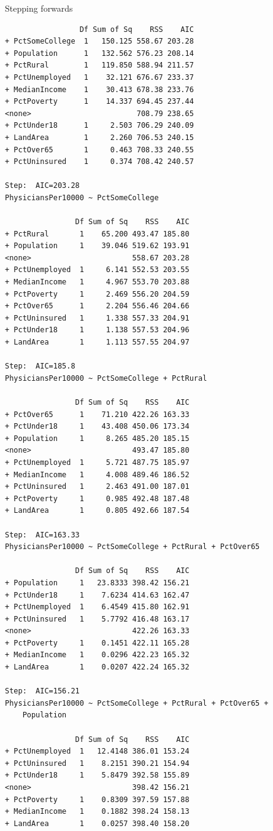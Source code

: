 \documentclass{beamer}\usepackage[]{graphicx}\usepackage[]{color}
\makeatletter
\newenvironment{kframe}{%
 \def\at@end@of@kframe{}%
 \ifinner\ifhmode%
  \def\at@end@of@kframe{\end{minipage}}%
  \begin{minipage}{\columnwidth}%
 \fi\fi%
 \def\FrameCommand##1{\hskip\@totalleftmargin \hskip-\fboxsep
 \colorbox{shadecolor}{##1}\hskip-\fboxsep
     \hskip-\linewidth \hskip-\@totalleftmargin \hskip\columnwidth}%
 \MakeFramed {\advance\hsize-\width
   \@totalleftmargin\z@ \linewidth\hsize
   \@setminipage}}%
 {\par\unskip\endMakeFramed%
 \at@end@of@kframe}
\newenvironment{knitrout}{}{} %
\makeatother
\begin{document}
\begin{darkframes}
\begin{frame}[fragile]{Stepping forwards}
\begin{knitrout}
\begin{kframe}
\begin{verbatim}
                 Df Sum of Sq    RSS    AIC
+ PctSomeCollege  1   150.125 558.67 203.28
+ Population      1   132.562 576.23 208.14
+ PctRural        1   119.850 588.94 211.57
+ PctUnemployed   1    32.121 676.67 233.37
+ MedianIncome    1    30.413 678.38 233.76
+ PctPoverty      1    14.337 694.45 237.44
<none>                        708.79 238.65
+ PctUnder18      1     2.503 706.29 240.09
+ LandArea        1     2.260 706.53 240.15
+ PctOver65       1     0.463 708.33 240.55
+ PctUninsured    1     0.374 708.42 240.57

Step:  AIC=203.28
PhysiciansPer10000 ~ PctSomeCollege

                Df Sum of Sq    RSS    AIC
+ PctRural       1    65.200 493.47 185.80
+ Population     1    39.046 519.62 193.91
<none>                       558.67 203.28
+ PctUnemployed  1     6.141 552.53 203.55
+ MedianIncome   1     4.967 553.70 203.88
+ PctPoverty     1     2.469 556.20 204.59
+ PctOver65      1     2.204 556.46 204.66
+ PctUninsured   1     1.338 557.33 204.91
+ PctUnder18     1     1.138 557.53 204.96
+ LandArea       1     1.113 557.55 204.97

Step:  AIC=185.8
PhysiciansPer10000 ~ PctSomeCollege + PctRural

                Df Sum of Sq    RSS    AIC
+ PctOver65      1    71.210 422.26 163.33
+ PctUnder18     1    43.408 450.06 173.34
+ Population     1     8.265 485.20 185.15
<none>                       493.47 185.80
+ PctUnemployed  1     5.721 487.75 185.97
+ MedianIncome   1     4.008 489.46 186.52
+ PctUninsured   1     2.463 491.00 187.01
+ PctPoverty     1     0.985 492.48 187.48
+ LandArea       1     0.805 492.66 187.54

Step:  AIC=163.33
PhysiciansPer10000 ~ PctSomeCollege + PctRural + PctOver65

                Df Sum of Sq    RSS    AIC
+ Population     1   23.8333 398.42 156.21
+ PctUnder18     1    7.6234 414.63 162.47
+ PctUnemployed  1    6.4549 415.80 162.91
+ PctUninsured   1    5.7792 416.48 163.17
<none>                       422.26 163.33
+ PctPoverty     1    0.1451 422.11 165.28
+ MedianIncome   1    0.0296 422.23 165.32
+ LandArea       1    0.0207 422.24 165.32

Step:  AIC=156.21
PhysiciansPer10000 ~ PctSomeCollege + PctRural + PctOver65 + 
    Population

                Df Sum of Sq    RSS    AIC
+ PctUnemployed  1   12.4148 386.01 153.24
+ PctUninsured   1    8.2151 390.21 154.94
+ PctUnder18     1    5.8479 392.58 155.89
<none>                       398.42 156.21
+ PctPoverty     1    0.8309 397.59 157.88
+ MedianIncome   1    0.1882 398.24 158.13
+ LandArea       1    0.0257 398.40 158.20


\end{verbatim}
\end{kframe}
\end{knitrout}
\end{frame}
\end{darkframes}
\end{document}
